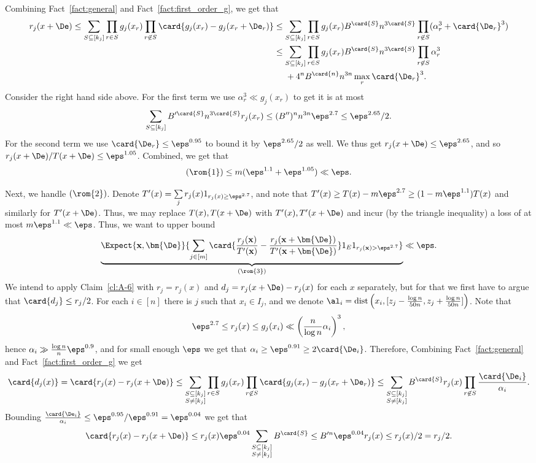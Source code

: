 Combining Fact~\ref{fact:general} and Fact~\ref{fact:first_order_g}, we get that
\begin{align*}
r_j(x+\De)
\leq \sum\limits_{S\subseteq[k_j]}{
  \prod\limits_{r\in S}{g_j(x_r)}
  \prod\limits_{r\not\in S}{\card{g_j(x_r)-g_j(x_r+\De_r)}}}
&\leq \sum\limits_{S\subseteq[k_j]}{
\prod\limits_{r\in S}{g_j(x_r)}
B^{\card{S}} n^{3\card{S}}\prod\limits_{r\not\in S}(\alpha_r^3 + \card{\De_r}^3)}\\
&\leq \sum\limits_{S\subseteq[k_j]}{
\prod\limits_{r\in S}{g_j(x_r)}
B^{\card{S}} n^{3\card{S}}\prod\limits_{r\not\in S}\alpha_r^3}\\
&\phantom{\leq_S}+4^{n}B^{\card{n}}n^{3n}\max_{r}\card{\De_r}^3.
\end{align*}
Consider the right hand side above. For the first term we use $\alpha_r^3\ll g_j(x_r)$ to get it is at most
\[
\sum\limits_{S\subseteq[k_j]}{B'^{\card{S}} n^{3\card{S}} r_j(x_r)}
\leq (B'')^n n^{3n} \eps^{2.7} \leq \eps^{2.65}/2.
\]
For the second term we use $\card{\De_r}\leq \eps^{0.95}$ to bound it by $\eps^{2.65}/2$ as well.
We thus get $r_j(x+\De)\leq \eps^{2.65}$, and so $r_j(x+\De)/T(x+\De)\leq \eps^{1.05}$. Combined, we get that
\[
{(\rom{1})}\leq m(\eps^{1.1}+ \eps^{1.05})\ll \eps.
\]

Next, we handle $(\rom{2})$. Denote $T'(x) = \sum\limits_{j}{r_j(x) 1_{r_j(x)\geq \eps^{2.7}}}$, and note that
$T'(x)\geq T(x) - m\eps^{2.7}\geq (1-m\eps^{1.1})T(x)$ and similarly for $T'(x+\De)$. Thus, we may replace
$T(x), T(x+\De)$ with $T'(x), T'(x+\De)$ and incur (by the triangle inequality) a loss of at most $m\eps^{1.1}\ll \eps$.
Thus, we want to upper bound
\[
\underbrace{\Expect{{\bf x},\bm{\De}}{\sum\limits_{j\in [m]}\card{\frac{r_j({\bf x})}{T'({\bf x})}-\frac{r_j({\bf x}+\bm{\De})}{T'({\bf x}+\bm{\De})}} 1_E 1_{r_j({\bf x}) >\eps^{2.7}}}}_{(\rom{3})}\ll \eps.
\]
We intend to apply Claim~\ref{cl:A-6} with $r_j = r_j(x)$ and $d_j = r_j(x+\De) - r_j(x)$ for each $x$ separately, but for that
we first have to argue that $\card{d_j}\leq r_j/2$.
For each $i\in [n]$ there is $j$ such that $x_i\in I_j$, and we denote
$\al_i =\text{dist}\left(x_i, [z_j-\frac{\log n}{50n},z_j+\frac{\log n}{50n}]\right)$. Note that
\[
\eps^{2.7}\leq r_j(x) \leq g_j(x_i)\ll \left(\frac{n}{\log n}\alpha_i\right)^3,
\]
hence $\alpha_i\gg \frac{\log n}{n}\eps^{0.9}$, and for small enough $\eps$ we get that $\alpha_i\geq \eps^{0.91}\geq 2\card{\De_i}$. Therefore,
Combining Fact~\ref{fact:general} and Fact~\ref{fact:first_order_g} we get
\[
\card{d_j(x)}
=\card{r_j(x) - r_j(x+\De)}
\leq \sum\limits_{\substack{S\subseteq[k_j]\\S\neq[k_j]}}{
  \prod\limits_{r\in S}{g_j(x_r)}
  \prod\limits_{r\not\in S}{\card{g_j(x_r)-g_j(x_r+\De_r)}}}
\leq
\sum\limits_{\substack{S\subseteq[k_j]\\S\neq[k_j]}}{ B^{\card{S}} r_j(x)
\prod\limits_{r\not\in S}{\frac{\card{\De_i}}{\alpha_i}}}.
\]
Bounding $\frac{\card{\De_i}}{\alpha_i}\leq \eps^{0.95}/\eps^{0.91} = \eps^{0.04}$ we get that
\[
\card{r_j(x) - r_j(x+\De)}\leq r_j(x) \eps^{0.04}
\sum\limits_{\substack{S\subseteq[k_j]\\S\neq[k_j]}}{B^{\card{S}}}
\leq B'^n \eps^{0.04} r_j(x)
\leq r_j(x)/2 = r_j/2.
\]


